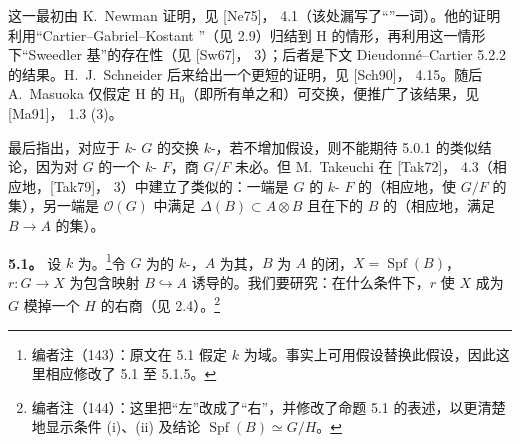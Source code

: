 这一最初由 K.~Newman 证明，见 [Ne75]， 4.1（该处漏写了“”一词）。他的证明利用“Cartier--Gabriel--Kostant ”（见 2.9）归结到 $\mathrm H$ 的情形，再利用这一情形下“Sweedler 基”的存在性（见 [Sw67]， 3）；后者是下文 Dieudonn\'e--Cartier  5.2.2 的结果。H.~J.~Schneider 后来给出一个更短的证明，见 [Sch90]， 4.15。随后 A.~Masuoka 仅假定 $\mathrm H$ 的 $\mathrm H_0$（即所有单之和）可交换，便推广了该结果，见 [Ma91]， 1.3 (3)。

最后指出，对应于 $k$- $G$ 的交换 $k$-，若不增加假设，则不能期待 5.0.1 的类似结论，因为对 $G$ 的一个 $k$- $F$，商 $G/F$ 未必。但 M.~Takeuchi 在 [Tak72]， 4.3（相应地，[Tak79]， 3）中建立了类似的：一端是 $G$ 的 $k$- $F$ 的（相应地，使 $G/F$ 的集），另一端是 $\mathcal O(G)$ 中满足 $\Delta(B)\subset A\otimes B$ 且在下的 $B$ 的（相应地，满足 $B\to A$ 的集）。

\textbf{5.1。} 设 $k$ 为。\footnote{编者注（143）：原文在 5.1 假定 $k$ 为域。事实上可用假设替换此假设，因此这里相应修改了 5.1 至 5.1.5。}令 $G$ 为的 $k$-，$A$ 为其，$B$ 为 $A$ 的闭，$X=\operatorname{Spf}(B)$，$r:G\to X$ 为包含映射 $B\hookrightarrow A$ 诱导的。我们要研究：在什么条件下，$r$ 使 $X$ 成为 $G$ 模掉一个 $H$ 的右商（见 2.4）。\footnote{编者注（144）：这里把“左”改成了“右”，并修改了命题 5.1 的表述，以更清楚地显示条件 (i)、(ii) 及结论 $\operatorname{Spf}(B)\simeq G/H$。}


